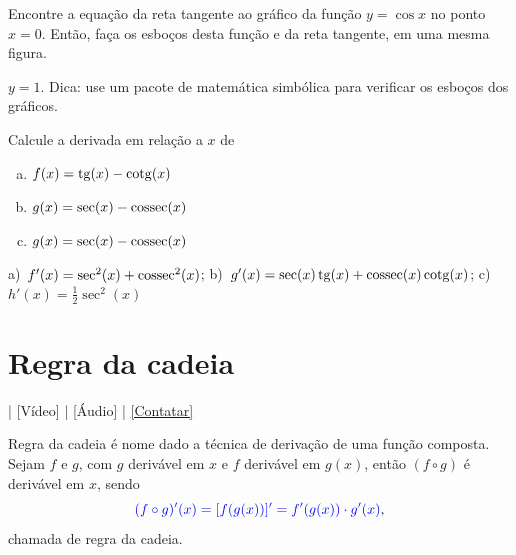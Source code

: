 \begin{exer}
  Encontre a equação da reta tangente ao gráfico da função $y = \cos x$ no ponto $x=0$. Então, faça os esboços desta função e da reta tangente, em uma mesma figura.  
\end{exer}
\begin{resp}
  $y = 1$. Dica: use um pacote de matemática simbólica para verificar os esboços dos gráficos.
\end{resp}

\begin{exer}
  Calcule a derivada em relação a $x$ de
  \begin{enumerate}[a)]
  \item $\displaystyle f(x)=\operatorname{tg}(x)-\operatorname{cotg}(x)$
  \item $\displaystyle g(x)=\sec(x)-\operatorname{cossec}(x)$
  \item $\displaystyle g(x)=\sec(x)-\operatorname{cossec}(x)$
  \end{enumerate}
\end{exer}
\begin{resp}
  a)~$f'(x)=\sec^2(x)+\operatorname{cossec}^2(x)$; b)~$g'(x)=\sec(x)\operatorname{tg}(x)+\operatorname{cossec}(x)\operatorname{cotg}(x)$; c)~$h'(x)=\frac{1}{2}\sec^2(x)$
\end{resp}


\section{Regra da cadeia}\label{cap_deriv_sec_cadeia}

\begin{flushright}
  [YouTube] | [Vídeo] | [Áudio] | \href{https://phkonzen.github.io/notas/contato.html}{[Contatar]}
\end{flushright}

Regra da cadeia é nome dado a técnica de derivação de uma função composta. Sejam $f$ e $g$, com $g$ derivável em $x$ e $f$ derivável em $g(x)$, então $(f\circ g)$ é derivável em $x$, sendo
\begin{equation}
  {\color{blue} (f\circ g)'(x) = [f(g(x))]' = f'(g(x))\cdot g'(x)},
\end{equation}
chamada de regra da cadeia.

